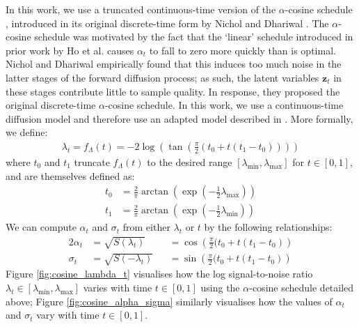\documentclass[ oneside,%
                    author={George Herbert},
                    degree={MSci},
                     title={Diffusion Models for Time-Evolving Precipitation Fields},
                  subtitle={}]{dissertation}
\begin{document}
In this work, we use a truncated continuous-time version of the $\alpha$-cosine schedule \cite{IDDPM_Nichol}, introduced in its original discrete-time form by Nichol and Dhariwal \cite{IDDPM_Nichol}. The $\alpha$-cosine schedule was motivated by the fact that the `linear' schedule introduced in prior work by Ho et al. \cite{DDPM_Ho} causes $\alpha_t$ to fall to zero more quickly than is optimal. Nichol and Dhariwal empirically found that this induces too much noise in the latter stages of the forward diffusion process; as such, the latent variables $\mathbf{z}_t$ in these stages contribute little to sample quality. In response, they proposed the original discrete-time $\alpha$-cosine schedule. In this work, we use a continuous-time diffusion model and therefore use an adapted model described in \cite{Simple_Diffusion_Hoogeboom}. More formally, we define:
\begin{align}
      \lambda_t=f_{\Lambda}(t)=-2\log\left(\tan\left(\frac{\pi}{2}(t_0+t(t_1-t_0))\right)\right)
      \label{eq:f_lambda_alpha_cosine}
\end{align} 
where $t_0$ and $t_1$ truncate $f_{\Lambda}(t)$ to the desired range $[\lambda_{\min}, \lambda_{\max}]$ for $t\in[0,1]$, and are themselves defined as:
\begin{align}
      t_0&=\frac{2}{\pi}\arctan\left(\exp\left(-\frac{1}{2}\lambda_{\max}\right)\right)\\
      t_1&=\frac{2}{\pi}\arctan\left(\exp\left(-\frac{1}{2}\lambda_{\min}\right)\right)
\end{align}
We can compute $\alpha_t$ and $\sigma_t$ from either $\lambda_t$ or $t$ by the following relationships:
\begin{alignat}{2}
      \alpha_t&=\sqrt{S(\lambda_t)}&&=\cos\left(\frac{\pi}{2}(t_0+t(t_1-t_0)\right)\label{eq:alpha_t_alpha_cosine}\\
      \sigma_t&=\sqrt{S(-\lambda_t)}&&=\sin\left(\frac{\pi}{2}(t_0+t(t_1-t_0)\right)\label{eq:sigma_t_alpha_cosine}
\end{alignat}
Figure \ref{fig:cosine_lambda_t} visualises how the log signal-to-noise ratio $\lambda_t\in[\lambda_{\min},\lambda_{\max}]$ varies with time $t\in[0,1]$ using the $\alpha$-cosine schedule detailed above; Figure \ref{fig:cosine_alpha_sigma} similarly visualises how the values of $\alpha_t$ and $\sigma_t$ vary with time $t\in[0,1]$.
\end{document}
